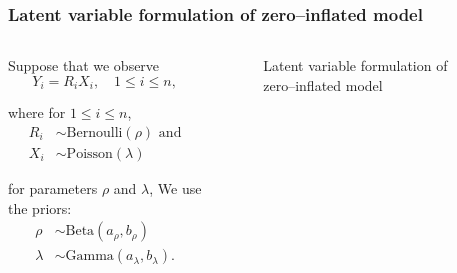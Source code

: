 \documentclass{beamer}
\begin{document}
\begin{frame}
	\frametitle{Latent variable formulation of zero--inflated model}
			
	\begin{columns}
		\begin{column}{0.8 \textwidth}
							
			Suppose that we observe
			$$
			Y_i = R_i X_i, \quad 1\le i\le n,
			$$
							
			\noindent where for $1\le i\le n$,
			\begin{align*} 
				R_i & \sim \text{Bernoulli}(\rho) \text{ and} \\
				X_i & \sim \text{Poisson}(\lambda)            
			\end{align*}
							
			\noindent for parameters $\rho$ and $\lambda$,
			We use the priors:
			\begin{align*} 
				\rho    & \sim \text{Beta}(a_\rho, b_\rho)         \\
				\lambda & \sim \text{Gamma}(a_\lambda, b_\lambda). 
			\end{align*}
		\end{column}
				
		\begin{column}{0.2 \textwidth}
			\begin{figure}
				\caption{Latent variable formulation of zero--inflated model}
			\end{figure}
		\end{column}
	\end{columns}
\end{frame}
\end{document}
